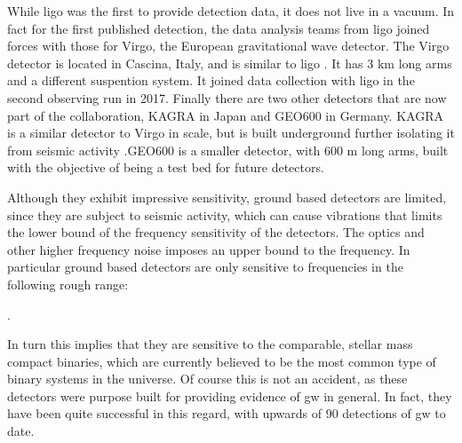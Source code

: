 \documentclass[
  11pt,
  a4paper,
  DIV=11,
  numbers=noendperiod,
  twoside]{scrreprt}
\let\[\relax \let\]\relax %
\DeclareRobustCommand{\[}{\begin{equation}}
\DeclareRobustCommand{\]}{\end{equation}}
\begin{document}
While \gls{ligo} was the first to provide detection data, it does not
live in a vacuum. In fact for the first published detection, the data
analysis teams from \gls{ligo} joined forces with those for Virgo, the
European gravitational wave detector. The Virgo detector is located in
Cascina, Italy, and is similar to \gls{ligo} . It has \(3\text{ km}\)
long arms and a different suspention system. It joined data collection
with \gls{ligo} in the second observing run in 2017. Finally there are
two other detectors that are now part of the collaboration, KAGRA in
Japan and GEO600 in Germany. KAGRA is a similar detector to Virgo in
scale, but is built underground further isolating it from seismic
activity .GEO600 is a smaller detector, with \(600 \text{ m}\) long
arms, built with the objective of being a test bed for future detectors.

Although they exhibit impressive sensitivity, ground based detectors are
limited, since they are subject to seismic activity, which can cause
vibrations that limits the lower bound of the frequency sensitivity of
the detectors. The optics and other higher frequency noise imposes an
upper bound to the frequency. In particular ground based detectors are
only sensitive to frequencies in the following rough range:

\[
.
\]

In turn this implies that they are sensitive to the comparable, stellar
mass  compact
binaries, which are currently believed to be the most common type of
binary systems in the universe. Of course this is not an accident, as
these detectors were purpose built for providing evidence of \gls{gw} in
general. In fact, they have been quite successful in this regard, with
upwards of 90 detections of \gls{gw} to date.
\end{document}
